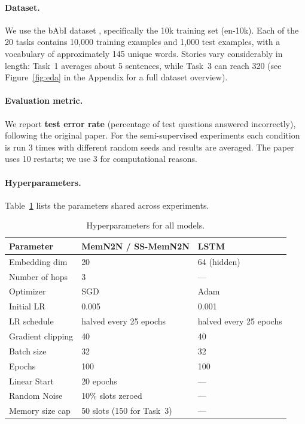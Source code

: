 \documentclass{article} %
\begin{document}
\paragraph{Dataset.}
We use the bAbI dataset \citep{weston2015towards}, specifically the 10k training set (en-10k). Each of the 20 tasks contains 10,000 training examples and 1,000 test examples, with a vocabulary of approximately 145 unique words. Stories vary considerably in length: Task~1 averages about 5 sentences, while Task~3 can reach 320 (see Figure~\ref{fig:eda} in the Appendix for a full dataset overview).

\paragraph{Evaluation metric.}
We report \textbf{test error rate} (percentage of test questions answered incorrectly), following the original paper. For the semi-supervised experiments each condition is run 3 times with different random seeds and results are averaged. The paper uses 10 restarts; we use 3 for computational reasons.

\paragraph{Hyperparameters.}
Table~\ref{tab:hyperparams} lists the parameters shared across experiments.

\begin{table}[h]
\centering
\caption{Hyperparameters for all models.}
\label{tab:hyperparams}
\vspace{4pt}
\begin{tabular}{lll}
\toprule
\textbf{Parameter} & \textbf{MemN2N / SS-MemN2N} & \textbf{LSTM} \\
\midrule
Embedding dim       & 20                          & 64 (hidden) \\
Number of hops      & 3                           & --- \\
Optimizer           & SGD                         & Adam \\
Initial LR          & 0.005                       & 0.001 \\
LR schedule         & halved every 25 epochs      & halved every 25 epochs \\
Gradient clipping   & 40                          & 40 \\
Batch size          & 32                          & 32 \\
Epochs              & 100                         & 100 \\
Linear Start        & 20 epochs                   & --- \\
Random Noise        & 10\% slots zeroed           & --- \\
Memory size cap     & 50 slots (150 for Task~3)   & --- \\
\bottomrule
\end{tabular}
\end{table}
\end{document}
